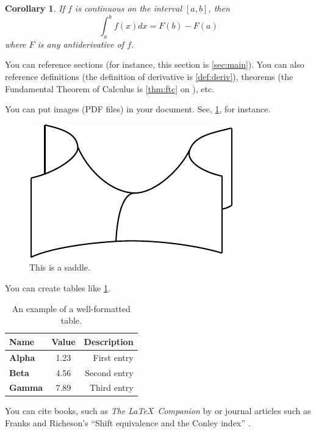 \documentclass[12pt]{amsart}
\theoremstyle{plain}
\newtheorem{corollary}[theorem]{Corollary}
\theoremstyle{definition}
\begin{document}
\begin{corollary}
If $f$ is continuous on the interval $[a,b]$, then \[\int_a^b f(x)dx=F(b)-F(a)\] where $F$ is any antiderivative of $f$.
\end{corollary}


You can reference sections (for instance, this section is \cref{sec:main}). You can also reference definitions (the definition of derivative is \cref{def:deriv}), theorems (the Fundamental Theorem of Calculus is \cref{thm:ftc} on ), etc.


You can put images (PDF files) in your document. See, \cref{fig:saddle}, for instance.

\begin{figure}[ht]
\centering
\includegraphics{saddle}
\caption{This is a saddle.}\label{fig:saddle}
\end{figure}

You can create tables like \cref{tab:sample}.

\begin{table}[ht]
\centering
\renewcommand{\arraystretch}{1.2} %
\begin{tabular}{>{\bfseries}l c r}
\toprule
Name & Value & Description \\
\midrule
Alpha & 1.23 & First entry \\
Beta & 4.56 & Second entry \\
Gamma & 7.89 & Third entry \\
\bottomrule
\end{tabular}
\caption{An example of a well-formatted table.}\label{tab:sample}
\end{table}



You can cite books, such as \emph{The \LaTeX\ Companion} by \textcite{GMS} or journal articles such as Franks and Richeson's ``Shift equivalence and the Conley index'' \parencite{FR}.

\printbibliography
\end{document}
